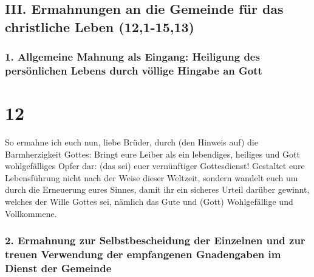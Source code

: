 \hypertarget{iii.-ermahnungen-an-die-gemeinde-fuxfcr-das-christliche-leben-121-1513}{%
\subsection{III. Ermahnungen an die Gemeinde für das christliche Leben
(12,1-15,13)}\label{iii.-ermahnungen-an-die-gemeinde-fuxfcr-das-christliche-leben-121-1513}}

\hypertarget{allgemeine-mahnung-als-eingang-heiligung-des-persuxf6nlichen-lebens-durch-vuxf6llige-hingabe-an-gott}{%
\subsubsection{1. Allgemeine Mahnung als Eingang: Heiligung des
persönlichen Lebens durch völlige Hingabe an
Gott}\label{allgemeine-mahnung-als-eingang-heiligung-des-persuxf6nlichen-lebens-durch-vuxf6llige-hingabe-an-gott}}

\hypertarget{section-11}{%
\section{12}\label{section-11}}

 So ermahne ich euch nun, liebe Brüder, durch (den Hinweis
auf) die Barmherzigkeit Gottes: Bringt eure Leiber als ein lebendiges,
heiliges und Gott wohlgefälliges Opfer dar: (das sei) euer vernünftiger
Gottesdienst!  Gestaltet eure Lebensführung nicht nach der
Weise dieser Weltzeit, sondern wandelt euch um durch die Erneuerung
eures Sinnes, damit ihr ein sicheres Urteil darüber gewinnt, welches der
Wille Gottes sei, nämlich das Gute und (Gott) Wohlgefällige und
Vollkommene.

\hypertarget{ermahnung-zur-selbstbescheidung-der-einzelnen-und-zur-treuen-verwendung-der-empfangenen-gnadengaben-im-dienst-der-gemeinde}{%
\subsubsection{2. Ermahnung zur Selbstbescheidung der Einzelnen und zur
treuen Verwendung der empfangenen Gnadengaben im Dienst der
Gemeinde}\label{ermahnung-zur-selbstbescheidung-der-einzelnen-und-zur-treuen-verwendung-der-empfangenen-gnadengaben-im-dienst-der-gemeinde}}

